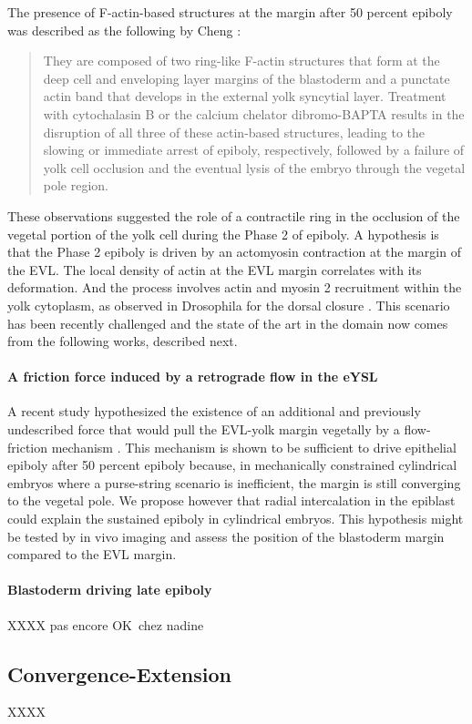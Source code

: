 The presence of F-actin-based structures at the margin after 50 percent epiboly was described as the following by Cheng \cite{Cheng:2004ff}:
\begin{quotation}  They are composed of two ring-like F-actin structures that form at the deep cell and enveloping layer margins of the blastoderm and a punctate actin band that develops in the external yolk syncytial layer. Treatment with cytochalasin B or the calcium chelator dibromo-BAPTA results in the disruption of all three of these actin-based structures, leading to the slowing or immediate arrest of epiboly, respectively, followed by a failure of yolk cell occlusion and the eventual lysis of the embryo through the vegetal pole region.  
\end{quotation}

These observations suggested the role of a contractile ring in the occlusion of the vegetal portion of the yolk cell during the Phase 2 of epiboly. A hypothesis is that the Phase 2 epiboly is driven by an actomyosin contraction at the margin of the EVL. The local density of actin at the EVL margin correlates with its deformation. And the process involves actin and myosin 2 recruitment within the yolk cytoplasm, as observed in Drosophila for the dorsal closure \cite{Koppen:2006fy}. This scenario has been recently challenged and the state of the art in the domain now comes from the following works, described next.

\paragraph{A friction force induced by a retrograde flow in the eYSL}


A recent study hypothesized the existence of an additional and previously undescribed force that would pull the EVL-yolk margin vegetally by a flow-friction mechanism \cite{Behrndt:2012gy}. This mechanism is shown to be sufficient to drive epithelial epiboly after 50 percent epiboly because, in mechanically constrained cylindrical embryos where a purse-string scenario is inefficient, the margin is still converging to the vegetal pole. We propose however that radial intercalation in the epiblast could explain the sustained epiboly in cylindrical embryos. This hypothesis might be tested by in vivo imaging and assess the position of the blastoderm margin compared to the EVL margin.

\paragraph{Blastoderm driving late epiboly}
  XXXX pas encore OK chez nadine  


\subsection{Convergence-Extension}
  XXXX   
